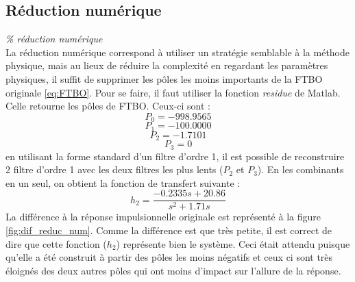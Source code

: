 \documentclass{udes_rapport} %
\begin{document}
\subsection{Réduction numérique}
\textit{\% réduction numérique} \\
La réduction numérique correspond à utiliser un stratégie semblable à la méthode physique, mais au lieux de réduire la complexité en regardant les paramètres physiques, il suffit de supprimer les pôles les moins importants de la FTBO originale \eqref{eq:FTBO}. Pour se faire, il faut utiliser la fonction \textit{residue} de Matlab. Celle retourne les pôles de FTBO. Ceux-ci sont :
\[	P_0 = -998.9565	\]
\[	P_1 = -100.0000	\]
\[	P_2 = -1.7101	\]
\[	P_3 = 0	\]
en utilisant la forme standard d'un filtre d'ordre 1, il est possible de reconstruire 2 filtre d'ordre 1 avec les deux filtres les plus lents ($P_2$ et $P_3$). En les combinants en un seul, on obtient la fonction de transfert suivante :
\begin{equation}
h_2 = \frac{-0.2335s + 20.86}{s^2 + 1.71s}
\end{equation}
La différence à la réponse impulsionnelle originale est représenté à la figure \ref{fig:dif_reduc_num}. Comme la différence est que très petite, il est correct de dire que cette fonction ($h_2$) représente bien le système. Ceci était attendu puisque qu'elle a été construit à partir des pôles les moins négatifs et ceux ci sont très éloignés des deux autres pôles qui ont moins d'impact sur l'allure de la réponse.

\end{document}
